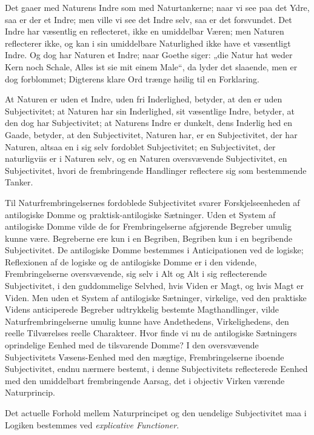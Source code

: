 \documentclass[12pt]{book}
\newcommand{\opage}[1]{\marginnote{\footnotesize\textit{[#1]}}}
\begin{document}
Det gaaer med Naturens Indre som med Naturtankerne;
naar vi see paa det Ydre, saa er der et Indre; men ville vi
see det Indre selv, saa er det forsvundet. Det Indre har
væsentlig en reflecteret, ikke en umiddelbar Væren; men
Naturen reflecterer ikke, og kan i sin umiddelbare Naturlighed
ikke have et væsentligt Indre. Og dog har Naturen et Indre;
naar Goethe siger: „die Natur hat weder Kern noch Schale,
Alles ist sie mit einem Male“, da lyder det slaaende, men er
dog forblommet; Digterens klare Ord trænge høilig til en
Forklaring.

At Naturen er uden et Indre, uden fri Inderlighed,
betyder, at den er uden Subjectivitet; at Naturen har sin
Inderlighed, sit væsentlige Indre, betyder, at den dog har
Subjectivitet; at Naturens Indre er dunkelt, dens Inderlig%
\opage{141}hed en Gaade, betyder, at den Subjectivitet, Naturen har,
er en Subjectivitet, der har Naturen, altsaa en i sig selv fordoblet
Subjectivitet; en Subjectivitet, der naturligviis er i
Naturen selv, og en Naturen oversvævende Subjectivitet, en
Subjectivitet, hvori de frembringende Handlinger reflectere sig
som bestemmende Tanker.

Til Naturfrembringelsernes fordoblede Subjectivitet svarer
Forskjelseenheden af antilogiske Domme og praktisk-antilogiske
Sætninger. Uden et System af antilogiske Domme vilde de
for Frembringelserne afgjørende Begreber umulig kunne være.
Begreberne ere kun i en Begriben, Begriben kun i en begribende
Subjectivitet. De antilogiske Domme bestemmes i
Anticipationen ved de logiske; Reflexionen af de logiske og de
antilogiske Domme er i den vidende, Frembringelserne oversvævende,
sig selv i Alt og Alt i sig reflecterende Subjectivitet,
i den guddommelige Selvhed, hvis Viden er Magt, og hvis
Magt er Viden. Men uden et System af antilogiske Sætninger,
virkelige, ved den praktiske Videns anticiperede Begreber
udtrykkelig bestemte Magthandlinger, vilde Naturfrembringelserne
umulig kunne have Andethedens, Virkelighedens,
den reelle Tilværelses reelle Charakteer. Hvor finde vi nu
de antilogiske Sætningers oprindelige Eenhed med de tilsvarende
Domme? I den oversvævende Subjectivitets Væsens-Eenhed
med den mægtige, Frembringelserne iboende Subjectivitet,
endnu nærmere bestemt, i denne Subjectivitets reflecterede
Eenhed med den umiddelbart frembringende Aarsag,
det i objectiv Virken værende Naturprincip.

Det actuelle Forhold mellem Naturprincipet og den
uendelige Subjectivitet maa i Logiken bestemmes ved \emph{explicative
Functioner}.
\end{document}
